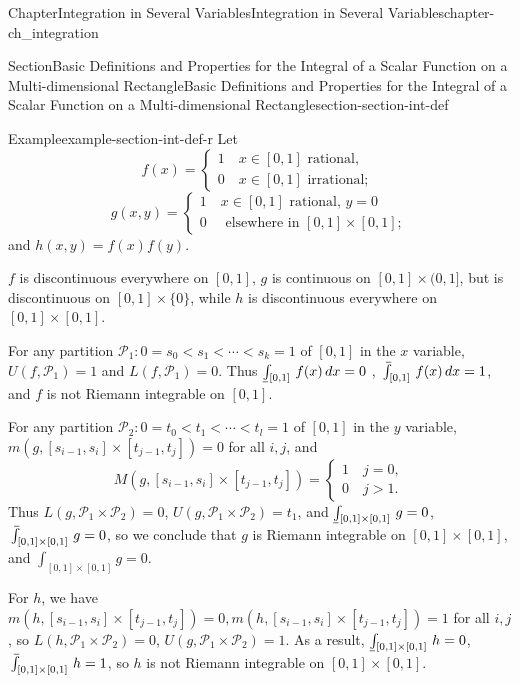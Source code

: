 \documentclass[oneside,10pt,]{book}
\makeatletter
\numberwithin{equation}{section}
\newcommand{\cP}{\mathcal{P}}
\def\upint{\mathchoice
    {\mkern10mu\overline{\vphantom{\intop}\mkern7mu}\mkern-24mu}
    {\mkern7mu\overline{\vphantom{\intop}\mkern7mu}\mkern-14mu}
    {\mkern7mu\overline{\vphantom{\intop}\mkern7mu}\mkern-14mu}
    {\mkern7mu\overline{\vphantom{\intop}\mkern7mu}\mkern-14mu}
  \int}
\def\lowint{\relax\if@display
 \mkern3mu\underline{\vphantom{\intop}\mkern7mu}\mkern-10mu\int
\else 
\underline{\vphantom{\int}\mkern7mu}\mkern-10mu\int
\fi}
\makeatother
\begin{document}
\begin{chapterptx}{Chapter}{Integration in Several Variables}{}{Integration in Several Variables}{}{}{chapter-ch_integration}
\begin{sectionptx}{Section}{Basic Definitions and Properties for the Integral of a Scalar Function on a Multi-dimensional Rectangle}{}{Basic Definitions and Properties for the Integral of a Scalar Function on a Multi-dimensional Rectangle}{}{}{section-section-int-def}
\begin{example}{Example}{}{example-section-int-def-r}
Let%
\begin{equation*}
f(x)=\begin{cases} 1 \quad x \in [0, 1] \text{ rational, } \\
0 \quad x \in [0, 1] \text{ irrational; } 
\end{cases}
\end{equation*}
%
\begin{equation*}
g(x, y) =\begin{cases} 1 \quad x \in [0, 1] \text{ rational, }  y=0\\
0 \quad \text{ elsewhere in } [0, 1]\times[0, 1]; 
\end{cases}
\end{equation*}
and \(h(x, y)=f(x)f(y)\).%
\par
\(f\) is discontinuous everywhere on \([0,1]\), \(g\) is continuous on \([0,1]\times (0, 1]\), but is discontinuous on \([0, 1]\times \{0\}\), while \(h\) is discontinuous everywhere on \([0,1]\times[0,1]\).%
\par
For any partition \(\cP_{1}: 0=s_{0} <  s_{1} < \cdots < s_{k}=1 \) of \([0, 1]\) in the \(x\) variable,  \(U(f, \cP_{1})=1\) and \(L(f, \cP_{1})=0\). Thus \(\lowint_{[0,1]}\, f(x)\, dx =0\) , \(\upint_{[0, 1]}\, f(x)\, dx =1\), and \(f\) is not Riemann integrable on \([0, 1]\).%
\par
For any partition \(\cP_{2}: 0=t_{0} <  t_{1} < \cdots < t_{l}=1 \) of \([0, 1]\) in the \(y\) variable,  \(m(g, [s_{i-1},s_{i}]\times[t_{j-1}, t_{j} ])=0\) for all \(i, j\), and%
\begin{equation*}
M(g, [s_{i-1},s_{i}]\times[t_{j-1}, t_{j} ])=\begin{cases} 1 \quad j=0,\\
0 \quad j>1. 
\end{cases}
\end{equation*}
Thus \(L(g, \cP_{1}\times \cP_{2})=0\), \(U(g, \cP_{1}\times \cP_{2})=t_{1}\), and \(\lowint_{[0,1]\times [0,1]}\, g =0\),   \(\upint_{[0,1]\times [0,1]}\, g =0\), so we conclude that \(g\) is Riemann integrable on \([0,1]\times [0,1]\), and \(\int_{[0,1]\times [0,1]} g =0\).%
\par
For \(h\), we have \(m(h, [s_{i-1},s_{i}]\times[t_{j-1}, t_{j} ])=0,
m(h, [s_{i-1},s_{i}]\times[t_{j-1}, t_{j} ])=1\) for all \(i, j\), so \(L(h, \cP_{1}\times \cP_{2})=0\), \(U(g, \cP_{1}\times \cP_{2})=1\). As a result, \(\lowint_{[0,1]\times [0,1]}\, h =0\), \(\upint_{[0,1]\times [0,1]}\, h =1\), so \(h\) is not Riemann integrable on \([0,1]\times [0,1]\).%
\end{example}

\end{sectionptx}
\end{chapterptx}
\end{document}
